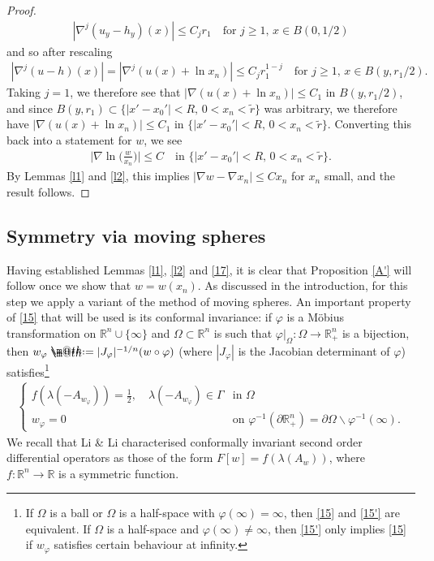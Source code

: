 \documentclass[12pt]{article}
\makeatletter
\numberwithin{equation}{section}
\theoremstyle{plain}
\theoremstyle{definition}
\renewcommand{\phi}{\varphi}
\newcommand*{\defeq}{\mathrel{\rlap{%
			\raisebox{0.3ex}{$\m@th\cdot$}}%
		\raisebox{-0.3ex}{$\m@th\cdot$}}%
	=}
\makeatother
\begin{document}
\begin{proof}
	\begin{align*}
	|\nabla^j(u_y - h_y)(x)| \leq C_jr_1 \quad \text{for }j\geq 1, \, x\in B(0, 1/2)
	\end{align*}
	and so after rescaling
	\begin{align*}
	|\nabla^j(u-h)(x)| = |\nabla^j (u(x) + \ln x_n)| \leq C_j r_1^{1-j} \quad\text{for }j\geq 1, \, x\in B(y,r_1/2).
	\end{align*}
	Taking $j=1$, we therefore see that $|\nabla(u(x) + \ln x_n)| \leq C_1$ in $B(y,r_1/2)$, and since $B(y, r_1) \subset \{|x'-x_0'| < R,\,0<x_n < \widetilde{r}\}$ was arbitrary, we therefore have $|\nabla(u(x) + \ln x_n)| \leq C_1$ in $\{|x'-x_0'| < R,\,0<x_n < \widetilde{r}\}$. Converting this back into a statement for $w$, we see
	\begin{align*}
	\bigg|\nabla \ln \bigg(\frac{w}{x_n}\bigg)\bigg| \leq C \quad \text{in }\{|x'-x_0'| < R,\,0<x_n < \widetilde{r}\}.
	\end{align*}
	By Lemmas \ref{l1} and \ref{l2}, this implies $|\nabla w - \nabla x_n| \leq Cx_n$ for $x_n$ small, and the result follows. 
\end{proof}


\subsection{Symmetry via moving spheres}\label{sym}



Having established Lemmas \ref{l1}, \ref{l2} and \ref{17}, it is clear that Proposition \ref{A'} will follow once we show that $w = w(x_n)$. As discussed in the introduction, for this step we apply a variant of the method of moving spheres. An important property of \eqref{15} that will be used is its conformal invariance: if $\phi$ is a M\"obius transformation on $\mathbb{R}^n\cup \{\infty\}$ and $\Omega\subset\mathbb{R}^n$ is such that $\phi|_\Omega:\Omega\rightarrow\mathbb{R}_+^n$ is a bijection, then $w_\phi \defeq |J_\phi|^{-1/n}(w\circ\phi)$ (where $|J_\phi|$ is the Jacobian determinant of $\phi$) satisfies\footnote{If $\Omega$ is a ball or $\Omega$ is a half-space with $\phi(\infty) = \infty$, then \eqref{15} and \eqref{15'} are equivalent. If $\Omega$ is a half-space and $\phi(\infty)\not=\infty$, then \eqref{15'} only implies \eqref{15} if $w_\phi$ satisfies certain behaviour at infinity.}
\begin{align}\label{15'}
\begin{cases}
f(\lambda(-A_{w_\phi})) = \frac{1}{2}, \quad \lambda(-A_{w_\phi})\in\Gamma & \text{in }\Omega \\
w_\phi = 0 & \text{on }\phi^{-1}(\partial\mathbb{R}_+^n) = \partial\Omega\backslash \phi^{-1}(\infty).
\end{cases}
\end{align}
We recall that Li \& Li \cite{LL03} characterised conformally invariant second order differential operators as those of the form $F[w] = f(\lambda(A_w))$, where $f:\mathbb{R}^n\rightarrow\mathbb{R}$ is a symmetric function.\medskip 
\end{document}
